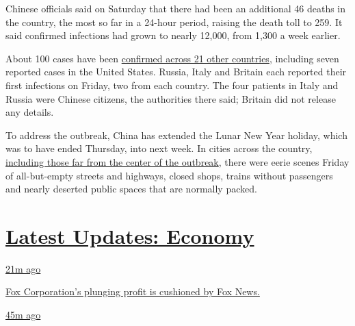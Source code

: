 Chinese officials said on Saturday that there had been an additional 46
deaths in the country, the most so far in a 24-hour period, raising the
death toll to 259. It said confirmed infections had grown to nearly
12,000, from 1,300 a week earlier.

About 100 cases have been
\href{https://www.nytimes3xbfgragh.onion/2020/02/01/nyregion/coronavirus-new-york-city.html}{confirmed
across 21 other countries}, including seven reported cases in the United
States. Russia, Italy and Britain each reported their first infections
on Friday, two from each country. The four patients in Italy and Russia
were Chinese citizens, the authorities there said; Britain did not
release any details.

To address the outbreak, China has extended the Lunar New Year holiday,
which was to have ended Thursday, into next week. In cities across the
country,
\href{https://www.nytimes3xbfgragh.onion/2020/01/25/world/asia/china-wuhan-coronavirus.html?searchResultPosition=2}{including
those far from the center of the outbreak}, there were eerie scenes
Friday of all-but-empty streets and highways, closed shops, trains
without passengers and nearly deserted public spaces that are normally
packed.

\hypertarget{latest-updates-economy}{%
\section{\texorpdfstring{\href{https://www.nytimes3xbfgragh.onion/live/2020/08/04/business/stock-market-today-coronavirus?action=click\&pgtype=Article\&state=default\&region=MAIN_CONTENT_1\&context=storylines_live_updates}{Latest
Updates:
Economy}}{Latest Updates: Economy}}\label{latest-updates-economy}}

\href{https://www.nytimes3xbfgragh.onion/live/2020/08/04/business/stock-market-today-coronavirus?action=click\&pgtype=Article\&state=default\&region=MAIN_CONTENT_1\&context=storylines_live_updates\#fox-corporations-plunging-profit-is-cushioned-by-fox-news}{21m
ago}

\href{https://www.nytimes3xbfgragh.onion/live/2020/08/04/business/stock-market-today-coronavirus?action=click\&pgtype=Article\&state=default\&region=MAIN_CONTENT_1\&context=storylines_live_updates\#fox-corporations-plunging-profit-is-cushioned-by-fox-news}{Fox
Corporation's plunging profit is cushioned by Fox News.}

\href{https://www.nytimes3xbfgragh.onion/live/2020/08/04/business/stock-market-today-coronavirus?action=click\&pgtype=Article\&state=default\&region=MAIN_CONTENT_1\&context=storylines_live_updates\#trading-in-kodak-shares-comes-under-scrutiny}{45m
ago}

